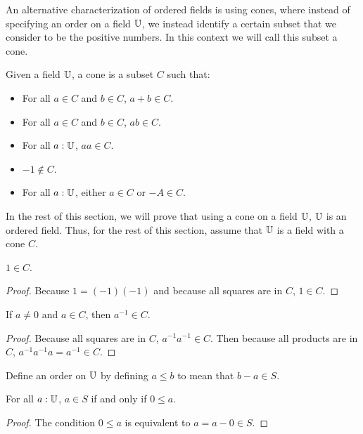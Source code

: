 \documentclass[../../math.tex]{subfiles}
\begin{document}
An alternative characterization of ordered fields is using cones, where instead
of specifying an order on a field $\mathbb{U}$, we instead identify a certain subset
that we consider to be the positive numbers.  In this context we will call this
subset a cone.

\begin{class}
    Given a field $\mathbb{U}$, a cone is a subset $C$ such that:
    \begin{itemize}
        \item For all $a \in C$ and $b \in C$, $a + b \in C$.
        \item For all $a \in C$ and $b \in C$, $ab \in C$.
        \item For all $a : \mathbb{U}$, $aa \in C$.
        \item $-1 \notin C$.
        \item For all $a : \mathbb{U}$, either $a \in C$ or $-A \in C$.
    \end{itemize}
\end{class}

In the rest of this section, we will prove that using a cone on a field $\mathbb{U}$,
$\mathbb{U}$ is an ordered field.  Thus, for the rest of this section, assume that $\mathbb{U}$
is a field with a cone $C$.

\begin{theorem} \label{cone_one}
    $1 \in C$.
\end{theorem}
\begin{proof}
    Because $1 = (-1)(-1)$ and because all squares are in $C$, $1 \in C$.
\end{proof}

\begin{theorem} \label{cone_div}
    If $a \neq 0$ and $a \in C$, then $a^{-1} \in C$.
\end{theorem}
\begin{proof}
    Because all squares are in $C$, $a^{-1}a^{-1} \in C$.  Then because all
    products are in $C$, $a^{-1}a^{-1}a = a^{-1} \in C$.
\end{proof}

\begin{instance}
    Define an order on $\mathbb{U}$ by defining $a \leq b$ to mean that $b - a \in S$.
\end{instance}

\begin{theorem} \label{cone_pos}
    For all $a : \mathbb{U}$, $a \in S$ if and only if $0 \leq a$.
\end{theorem}
\begin{proof}
    The condition $0 \leq a$ is equivalent to $a = a - 0 \in S$.
\end{proof}
\end{document}
